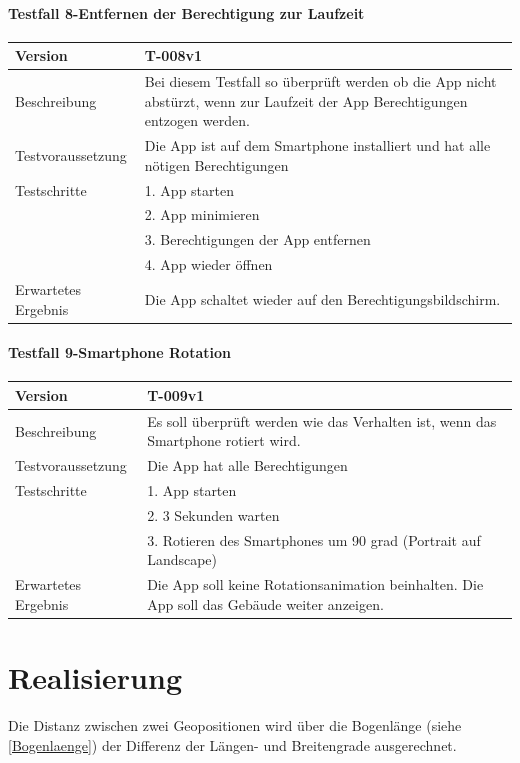 \documentclass[a4paper]{scrreprt}
\begin{document}
\subsubsection{Testfall 8-Entfernen der Berechtigung zur Laufzeit}
\begin{tabularx}{\textwidth}{|l|X|}
\hline 
	Version &
	T-008v1 \\ 
\hline 
	Beschreibung & 
	Bei diesem Testfall so überprüft werden ob die App nicht abstürzt, wenn zur Laufzeit der App Berechtigungen entzogen werden. \\ 
\hline 
	Testvoraussetzung &
	Die App ist auf dem Smartphone installiert und hat alle nötigen Berechtigungen \\ 
\hline 
	Testschritte & 
		1. App starten \\ &
		2. App minimieren \\ &
		3. Berechtigungen der App entfernen \\ &
		4. App wieder öffnen \\
\hline
	Erwartetes Ergebnis &
	Die App schaltet wieder auf den Berechtigungsbildschirm. \\ 
\hline 
\end{tabularx}
\subsubsection{Testfall 9-Smartphone Rotation}
\begin{tabularx}{\textwidth}{|l|X|}
\hline 
	Version &
	T-009v1 \\ 
\hline 
	Beschreibung & 
	Es soll überprüft werden wie das Verhalten ist, wenn das Smartphone rotiert wird. \\ 
\hline 
	Testvoraussetzung &
	Die App hat alle Berechtigungen \\ 
\hline 
	Testschritte & 
		1. App starten \\ &
		2. 3 Sekunden warten \\ &
		3. Rotieren des Smartphones um 90 grad (Portrait auf Landscape) \\
\hline
	Erwartetes Ergebnis &
	Die App soll keine Rotationsanimation beinhalten. Die App soll das Gebäude weiter anzeigen. \\ 
\hline 
\end{tabularx}

\chapter{Realisierung}

Die Distanz zwischen zwei Geopositionen wird über die Bogenlänge (siehe \ref{Bogenlaenge}) der Differenz der Längen- und Breitengrade ausgerechnet.
\end{document}

